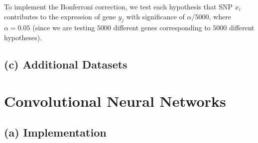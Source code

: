\documentclass{article}[11pt]
\begin{document}
To implement the Bonferroni correction, we test
each hypothesis that SNP $x_i$ contributes
to the expression of gene $y_j$ with significance
of $\alpha / 5000$, where $\alpha = 0.05$ (since we are testing
$5000$ different genes corresponding to $5000$ different hypotheses).

\subsection*{(c) Additional Datasets}

\section{Convolutional Neural Networks}
\subsection*{(a) Implementation}
\end{document}
